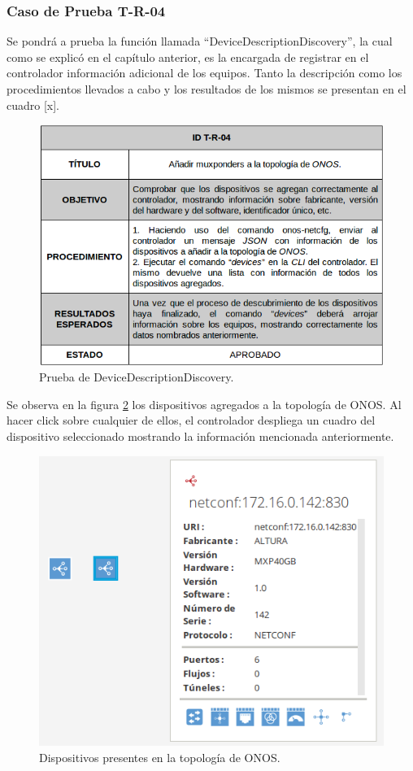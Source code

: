 \subsubsection{Caso de Prueba T-R-04}

Se pondrá a prueba la función llamada “DeviceDescriptionDiscovery”, la cual como se explicó en el capítulo anterior, es la encargada de registrar en el controlador información adicional de los equipos. Tanto la descripción como los procedimientos llevados a cabo y los resultados de los mismos se presentan en el cuadro [x]. 

\begin{figure}[H]
	\centering
	\includegraphics[scale=0.6]{Figures/test4.png}
	\caption{Prueba de DeviceDescriptionDiscovery.}
	\label{fig:test2}
  \end{figure}

  Se observa en la figura \ref{fig:test4_consulta} los dispositivos agregados a la topología de ONOS. Al hacer click sobre cualquier de ellos, el controlador despliega un cuadro del dispositivo seleccionado mostrando la información mencionada anteriormente.

  \begin{figure}[H]
	\centering
	\includegraphics[scale=0.5]{Figures/test4_consulta.png}
	\caption{Dispositivos presentes en la topología de ONOS.}
	\label{fig:test4_consulta}
  \end{figure}


